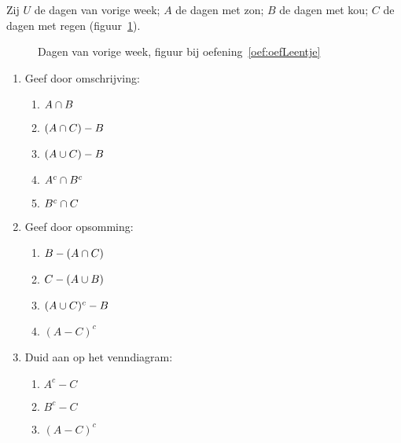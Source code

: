 \begin{oef}
\label{oef:oefLeentje}
%
Zij $U$ de dagen van vorige week; $A$ de dagen met zon; $B$ de dagen met kou; $C$ de dagen met regen (figuur~\ref{fig:dagen}).
\begin{figure}[htbp]
\centering

\caption{Dagen van vorige week, figuur bij oefening~\ref{oef:oefLeentje}}
\label{fig:dagen}
\end{figure}
\begin{enumerate}
\item Geef door omschrijving:
\begin{enumerate}
\item $A\cap B$
\item $(A\cap C)-B$
\item $(A\cup C)-B$
\item $A^c\cap B^c$
\item $B^c\cap C$
\end{enumerate}
\item Geef door opsomming:
\begin{enumerate}
\item $B-(A\cap C)$
\item $C-(A\cup B)$
\item $(A\cup C)^c-B$
\item $(A-C)^c$
\end{enumerate}
\item Duid aan op het venndiagram:
\begin{enumerate}
\item $A^c-C$
\item $B^c -C$
\item $(A-C)^c$
\end{enumerate}
\end{enumerate}


\end{oef}
